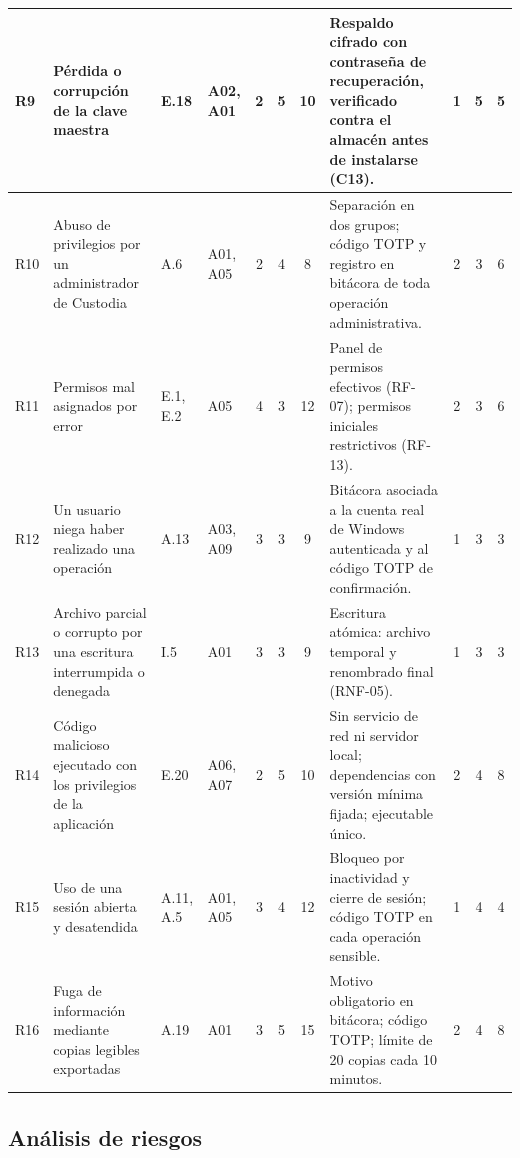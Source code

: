 \documentclass[conference]{IEEEtran}
\newcommand{\B}{\cellcolor{rbajo}}
\newcommand{\M}{\cellcolor{rmedio}}
\newcommand{\A}{\cellcolor{ralto}}
\begin{document}
\begin{table}[!t]
\begin{tabular}{|l|p{4.6cm}|l|l|c|c|c|p{5.9cm}|c|c|c|}
\hline
R9 & Pérdida o corrupción de la clave maestra & E.18 & A02, A01 & 2 & 5 & \A 10 & Respaldo cifrado con contraseña de recuperación, verificado contra el almacén antes de instalarse (C13). & 1 & 5 & \M 5 \\
\hline
R10 & Abuso de privilegios por un administrador de Custodia & A.6 & A01, A05 & 2 & 4 & \M 8 & Separación en dos grupos; código TOTP y registro en bitácora de toda operación administrativa. & 2 & 3 & \M 6 \\
\hline
R11 & Permisos mal asignados por error & E.1, E.2 & A05 & 4 & 3 & \A 12 & Panel de permisos efectivos (RF-07); permisos iniciales restrictivos (RF-13). & 2 & 3 & \M 6 \\
\hline
R12 & Un usuario niega haber realizado una operación & A.13 & A03, A09 & 3 & 3 & \M 9 & Bitácora asociada a la cuenta real de Windows autenticada y al código TOTP de confirmación. & 1 & 3 & \B 3 \\
\hline
R13 & Archivo parcial o corrupto por una escritura interrumpida o denegada & I.5 & A01 & 3 & 3 & \M 9 & Escritura atómica: archivo temporal y renombrado final (RNF-05). & 1 & 3 & \B 3 \\
\hline
R14 & Código malicioso ejecutado con los privilegios de la aplicación & E.20 & A06, A07 & 2 & 5 & \A 10 & Sin servicio de red ni servidor local; dependencias con versión mínima fijada; ejecutable único. & 2 & 4 & \M 8 \\
\hline
R15 & Uso de una sesión abierta y desatendida & A.11, A.5 & A01, A05 & 3 & 4 & \A 12 & Bloqueo por inactividad y cierre de sesión; código TOTP en cada operación sensible. & 1 & 4 & \B 4 \\
\hline
R16 & Fuga de información mediante copias legibles exportadas & A.19 & A01 & 3 & 5 & \A 15 & Motivo obligatorio en bitácora; código TOTP; límite de 20 copias cada 10 minutos. & 2 & 4 & \M 8 \\
\hline
\end{tabular}
\end{table}

\subsection{Análisis de riesgos}
\label{sec:riesgos}
\end{document}
